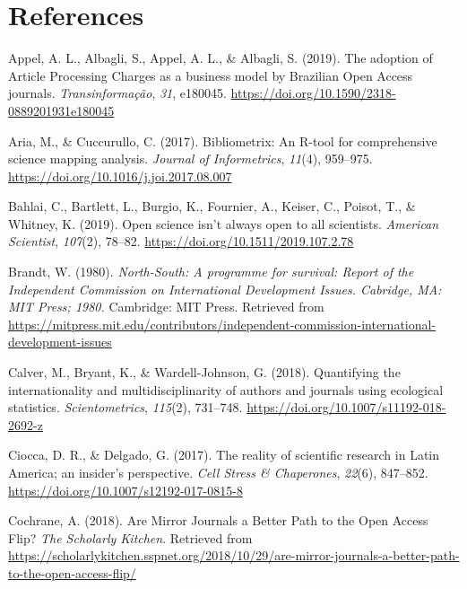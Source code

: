 \documentclass[english,man]{apa6}
\begin{document}
\newpage

\hypertarget{references}{%
\section{References}\label{references}}

\begingroup
\setlength{\parindent}{-0.5in}
\setlength{\leftskip}{0.5in}

\hypertarget{refs}{}
\leavevmode\hypertarget{ref-appel_adoption_2019}{}%
Appel, A. L., Albagli, S., Appel, A. L., \& Albagli, S. (2019). The adoption of Article Processing Charges as a business model by Brazilian Open Access journals. \emph{Transinformação}, \emph{31}, e180045. \url{https://doi.org/10.1590/2318-0889201931e180045}

\leavevmode\hypertarget{ref-aria_bibliometrix_2017}{}%
Aria, M., \& Cuccurullo, C. (2017). Bibliometrix: An R-tool for comprehensive science mapping analysis. \emph{Journal of Informetrics}, \emph{11}(4), 959--975. \url{https://doi.org/10.1016/j.joi.2017.08.007}

\leavevmode\hypertarget{ref-bahlai_open_2019}{}%
Bahlai, C., Bartlett, L., Burgio, K., Fournier, A., Keiser, C., Poisot, T., \& Whitney, K. (2019). Open science isn't always open to all scientists. \emph{American Scientist}, \emph{107}(2), 78--82. \url{https://doi.org/10.1511/2019.107.2.78}

\leavevmode\hypertarget{ref-brandt_north-south_1980}{}%
Brandt, W. (1980). \emph{North-South: A programme for survival: Report of the Independent Commission on International Development Issues. Cabridge, MA: MIT Press; 1980.} Cambridge: MIT Press. Retrieved from \url{https://mitpress.mit.edu/contributors/independent-commission-international-development-issues}

\leavevmode\hypertarget{ref-calver_quantifying_2018}{}%
Calver, M., Bryant, K., \& Wardell-Johnson, G. (2018). Quantifying the internationality and multidisciplinarity of authors and journals using ecological statistics. \emph{Scientometrics}, \emph{115}(2), 731--748. \url{https://doi.org/10.1007/s11192-018-2692-z}

\leavevmode\hypertarget{ref-ciocca_reality_2017}{}%
Ciocca, D. R., \& Delgado, G. (2017). The reality of scientific research in Latin America; an insider's perspective. \emph{Cell Stress \& Chaperones}, \emph{22}(6), 847--852. \url{https://doi.org/10.1007/s12192-017-0815-8}

\leavevmode\hypertarget{ref-cochrane_are_2018}{}%
Cochrane, A. (2018). Are Mirror Journals a Better Path to the Open Access Flip? \emph{The Scholarly Kitchen}. Retrieved from \url{https://scholarlykitchen.sspnet.org/2018/10/29/are-mirror-journals-a-better-path-to-the-open-access-flip/}
\end{document}
